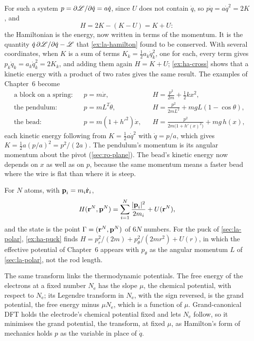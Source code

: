 For such a system $p = \partial\mathscr{L}/\partial\dot{q} = a\dot{q}$, since $U$
does not contain $\dot{q}$, so $p\dot{q} = a\dot{q}^2 = 2K$, and
\begin{equation*}
   H = 2K - (K - U) = K + U :
\end{equation*}
the Hamiltonian is the energy, now written in terms of the momentum. It
is the quantity $\dot{q}\,\partial\mathscr{L}/\partial\dot{q} - \mathscr{L}$ that
\cref{ex:la-hamilton} found to be conserved. With several coordinates,
when $K$ is a sum of terms $K_k = \frac12 a_k\dot{q}_k^2$, one for each,
every term gives $p_k\dot{q}_k = a_k\dot{q}_k^2 = 2K_k$, and adding them
again $H = K + U$; \cref{ex:ha-cross}
shows that a kinetic energy with a product of two rates gives the same
result. The examples of Chapter~6 become
\begin{align*}
   &\text{a block on a spring:}
   && p = m\dot{x} ,
   && H = \frac{p^2}{2m} + \frac12 kx^2 ,\\
   &\text{the pendulum:}
   && p = mL^2\dot\theta ,
   && H = \frac{p^2}{2mL^2} + mgL(1 - \cos\theta) ,\\
   &\text{the bead:}
   && p = m(1 + h'^2)\dot{x} ,
   && H = \frac{p^2}{2m\bigl(1 + h'(x)^2\bigr)} + mg\,h(x) ,
\end{align*}
each kinetic energy following from $K = \frac12 a\dot{q}^2$ with $\dot{q}
= p/a$, which gives $K = \frac12 a(p/a)^2 = p^2/(2a)$. The pendulum's
momentum is its angular momentum about the pivot (\cref{sec:ro-plane}).
The bead's kinetic energy now depends on $x$ as well as on $p$, because
the same momentum means a faster bead where the wire is flat than where
it is steep.

For $N$ atoms, with $\bm{\mathrm{p}}_i = m_i\dot{\bm{\mathrm{r}}}_i$,
\begin{equation*}
   H(\bm{\mathrm{r}}^N, \bm{\mathrm{p}}^N) = \sum_{i=1}^{N}\frac{\lvert\bm{\mathrm{p}}_i\rvert^2}
   {2m_i} + U(\bm{\mathrm{r}}^N) ,
\end{equation*}
and the state is the point $\Gamma = (\bm{\mathrm{r}}^N, \bm{\mathrm{p}}^N)$ of $6N$
numbers. For the puck of \cref{sec:la-polar}, \cref{ex:ha-puck} finds
$H = p_r^2/(2m) + p_\theta^2/(2mr^2) + U(r)$, in which the effective
potential of Chapter~6 appears with $p_\theta$ as the angular momentum $L$
of \cref{sec:la-polar}, not the rod length.

\begin{bridge}
The same transform links the thermodynamic potentials. The free energy of
the electrons at a fixed number $N_{\mathrm{e}}$ has the slope $\mu$, the
chemical potential, with respect to $N_{\mathrm{e}}$; its Legendre
transform in $N_{\mathrm{e}}$, with the sign reversed, is the grand
potential, the free energy minus $\mu N_{\mathrm{e}}$, which is a function
of $\mu$. Grand-canonical DFT holds the electrode's chemical potential
fixed and lets $N_{\mathrm{e}}$ follow, so it minimises the grand
potential, the transform, at fixed $\mu$, as Hamilton's form of mechanics
holds $p$ as the variable in place of $\dot{q}$.
\end{bridge}

